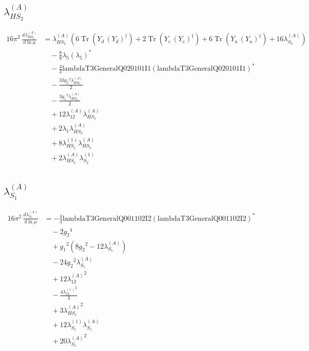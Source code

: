 \documentclass[10pt,a4paper]{article}
\begin{document}
\subsection*{$\lambda_{HS_2}^{(A)}$}
\begin{align*}
16\pi^2\,\frac{d \lambda_{HS_2}^{(A)}}{d\ln\mu} &={\lambda_{HS_2}^{(A)}} (6 \operatorname{Tr}\!\left({Y_d}\,\left({Y_d}\right)^{\dagger}\right)+2 \operatorname{Tr}\!\left({Y_e}\,\left({Y_e}\right)^{\dagger}\right)+6 \operatorname{Tr}\!\left({Y_u}\,\left({Y_u}\right)^{\dagger}\right)+16 {\lambda_{S_2}^{(A)}}) \\
&\quad -\frac{8}{9} {\lambda_5} \left({\lambda_5}\right)^{*} \\
&\quad -\frac{4}{3} \text{lambdaT3GeneralQ020101I1} \left(\text{lambdaT3GeneralQ020101I1}\right)^{*} \\
&\quad -\frac{33 {g_2}^2 {\lambda_{HS_2}^{(A)}}}{2} \\
&\quad -\frac{3 {g_1}^2 {\lambda_{HS_2}^{(A)}}}{2} \\
&\quad +12 {\lambda_{12}^{(A)}} {\lambda_{HS_1}^{(A)}} \\
&\quad +2 {\lambda_1} {\lambda_{HS_2}^{(A)}} \\
&\quad +8 {\lambda_{HS_2}^{(1)}} {\lambda_{HS_2}^{(A)}} \\
&\quad +2 {\lambda_{HS_2}^{(A)}} {\lambda_{S_2}^{(1)}} \\
\end{align*}
\subsection*{$\lambda_{S_1}^{(A)}$}
\begin{align*}
16\pi^2\,\frac{d \lambda_{S_1}^{(A)}}{d\ln\mu} &=-\frac{4}{3} \text{lambdaT3GeneralQ001102I2} \left(\text{lambdaT3GeneralQ001102I2}\right)^{*} \\
&\quad -2 {g_2}^4 \\
&\quad +{g_1}^2 \left(8 {g_2}^2-12 {\lambda_{S_1}^{(A)}}\right) \\
&\quad -24 {g_2}^2 {\lambda_{S_1}^{(A)}} \\
&\quad +12 {\lambda_{12}^{(A)}}^2 \\
&\quad -\frac{4 {\lambda_{12}^{(\times)}}^2}{3} \\
&\quad +3 {\lambda_{HS_1}^{(A)}}^2 \\
&\quad +12 {\lambda_{S_1}^{(1)}} {\lambda_{S_1}^{(A)}} \\
&\quad +20 {\lambda_{S_1}^{(A)}}^2 \\
\end{align*}
\end{document}
